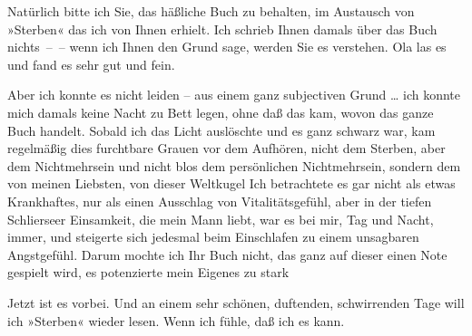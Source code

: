 \pstart
           Natürlich bitte ich Sie, das häßliche Buch zu behalten, im Austausch von »Sterben« {\pb}das ich von Ihnen
               erhielt. Ich schrieb Ihnen damals über das Buch nichts – – wenn ich Ihnen den Grund
               sage, werden Sie es verstehen. Ola las es und
               fand es sehr gut und fein.\pend
           
\pstart
           Aber ich konnte es nicht leiden – aus einem ganz subjectiven Grund {\dots} ich konnte mich damals keine Nacht zu Bett legen, ohne
               daß das kam, wovon das ganze Buch handelt. Sobald ich das Licht auslöschte und es
               ganz schwarz war, kam regelmäßig dies furchtbare Grauen vor dem Aufhören, nicht dem
               Sterben, aber dem Nichtmehrsein und nicht blos dem persönlichen Nichtmehrsein,
               sondern dem von meinen Liebsten, von dieser Weltkugel{\dotsfour} Ich
               betrachtete es gar nicht als etwas Krankhaftes, nur als einen Ausschlag von
               Vitalitätsgefühl, aber in der tiefen Schlierseer
               Einsamkeit, die mein Mann
               liebt, war es bei mir, Tag und Nacht, immer, und steigerte sich jedesmal beim
               Einschlafen zu einem unsagbaren Angstgefühl. Darum mochte ich Ihr Buch nicht, das ganz auf dieser einen Note
               gespielt wird, es potenzierte mein Eigenes zu stark{\dotsfour}\pend
           
\pstart
           Jetzt ist es vorbei. Und an einem sehr schönen, duftenden, schwirrenden Tage will ich
                  »Sterben« wieder lesen. Wenn ich fühle, daß
                  {\pb}ich es kann.\pend
           
